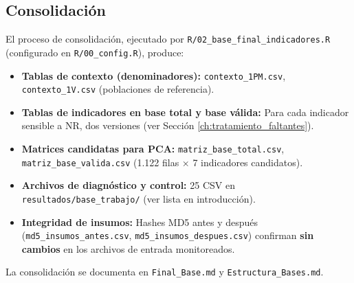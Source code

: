 \subsection{Consolidación}
\label{sec:consolidacion}

El proceso de consolidación, ejecutado por \texttt{R/02\_base\_final\_indicadores.R} (configurado en \texttt{R/00\_config.R}), produce:

\begin{itemize}
    \item \textbf{Tablas de contexto (denominadores):} \texttt{contexto\_1PM.csv}, \texttt{contexto\_1V.csv} (poblaciones de referencia).
    \item \textbf{Tablas de indicadores en base total y base válida:} Para cada indicador sensible a NR, dos versiones (ver Sección \ref{ch:tratamiento_faltantes}).
    \item \textbf{Matrices candidatas para PCA:} \texttt{matriz\_base\_total.csv}, \texttt{matriz\_base\_valida.csv} (1.122 filas $\times$ 7 indicadores candidatos).
    \item \textbf{Archivos de diagnóstico y control:} 25 CSV en \texttt{resultados/base\_trabajo/} (ver lista en introducción).
    \item \textbf{Integridad de insumos:} Hashes MD5 antes y después (\texttt{md5\_insumos\_antes.csv}, \texttt{md5\_insumos\_despues.csv}) confirman \textbf{sin cambios} en los archivos de entrada monitoreados.
\end{itemize}

La consolidación se documenta en \texttt{Final\_Base.md} y \texttt{Estructura\_Bases.md}.


